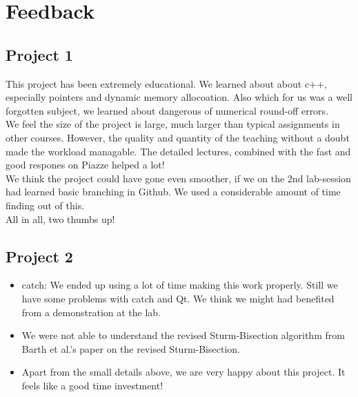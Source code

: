 \documentclass{article}
\begin{document}
\section{Feedback}
\subsection{Project 1}
This project has been extremely educational. We learned about about c++, especially pointers and dynamic memory allocoation. Also which for us was a well forgotten subject, we learned about dangerous of numerical round-off errors. \\

We feel the size of the project is large, much larger than typical assignments in other courses. However, the quality and quantity of the teaching without a doubt made the workload managable. The detailed lectures, combined with the fast and good respones on Piazze helped a lot!\\

We think the project could have gone even smoother, if we on the 2nd lab-session had learned basic branching in Github. We used a considerable amount of time finding out of this.\\

All in all, two thumbs up!

\subsection{Project 2}
\begin{itemize}
	\item  catch: We ended up using a lot of time making this work properly. Still we have some problems with catch and Qt. We think we might had benefited from a demonstration at the lab.
	
	\item We were not able to understand the revised Sturm-Bisection algorithm from Barth et al.'s \cite{barth} paper on the revised Sturm-Bisection. 
	
	\item Apart from the small details above, we are very happy about this project. It feels like a good time investment!
\end{itemize}
\end{document}
